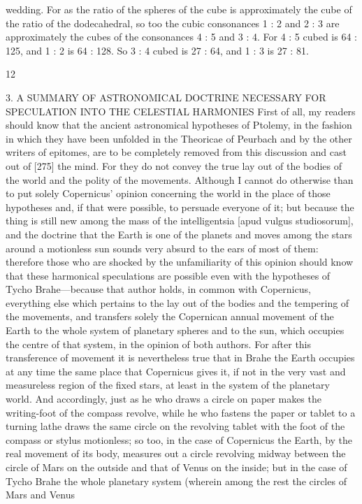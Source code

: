 \documentclass{article}
\begin{document}
wedding. For as the ratio of the spheres of the cube is approximately the
cube of the ratio of the dodecahedral, so too the cubic consonances 1 : 2
and 2 : 3 are approximately the cubes of the consonances 4 : 5 and 3 : 4.
For 4 : 5 cubed is 64 : 125, and 1 : 2 is 64 : 128. So 3 : 4 cubed is 27 : 64,
and 1 : 3 is 27 : 81.


12

3. A SUMMARY OF ASTRONOMICAL DOCTRINE
NECESSARY FOR SPECULATION INTO THE
CELESTIAL HARMONIES
First of all, my readers should know that the ancient astronomical
hypotheses of Ptolemy, in the fashion in which they have been unfolded
in the Theoricae of Peurbach and by the other writers of epitomes, are to
be completely removed from this discussion and cast out of [275] the
mind. For they do not convey the true lay out of the bodies of the world
and the polity of the movements.
Although I cannot do otherwise than to put solely Copernicus’ opinion
concerning the world in the place of those hypotheses and, if that were
possible, to persuade everyone of it; but because the thing is still new
among the mass of the intelligentsia [apud vulgus studiosorum], and the
doctrine that the Earth is one of the planets and moves among the stars
around a motionless sun sounds very absurd to the ears of most of them:
therefore those who are shocked by the unfamiliarity of this opinion
should know that these harmonical speculations are possible even with
the hypotheses of Tycho Brahe—because that author holds, in common
with Copernicus, everything else which pertains to the lay out of the
bodies and the tempering of the movements, and transfers solely the
Copernican annual movement of the Earth to the whole system of
planetary spheres and to the sun, which occupies the centre of that
system, in the opinion of both authors. For after this transference of
movement it is nevertheless true that in Brahe the Earth occupies at any
time the same place that Copernicus gives it, if not in the very vast and
measureless region of the fixed stars, at least in the system of the
planetary world. And accordingly, just as he who draws a circle on paper
makes the writing-foot of the compass revolve, while he who fastens the
paper or tablet to a turning lathe draws the same circle on the revolving
tablet with the foot of the compass or stylus motionless; so too, in the
case of Copernicus the Earth, by the real movement of its body, measures
out a circle revolving midway between the circle of Mars on the outside
and that of Venus on the inside; but in the case of Tycho Brahe the whole
planetary system (wherein among the rest the circles of Mars and Venus
\end{document}
